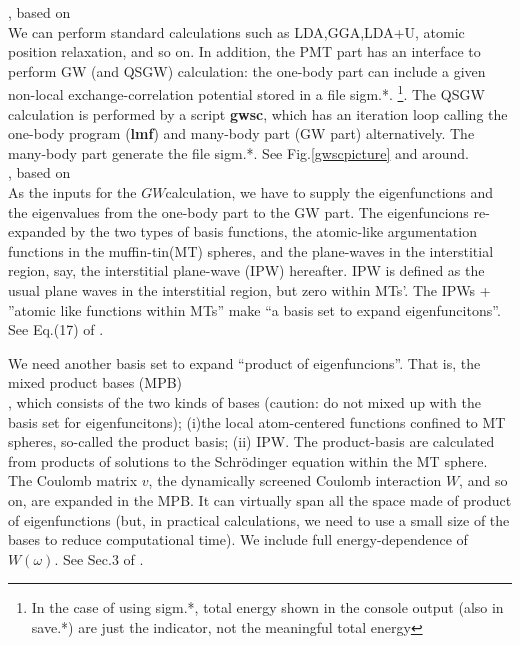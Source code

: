 \documentclass[a4paper,10pt,epsf,fleqn]{article}
\newcommand{\GW}{$GW$}
\newcommand{\exe}[1]{{\bf #1}}
\newcommand{\io}[1]{{\sf  #1}}
\begin{document}
, based on \cite{kotani2015pmt}\\
We can perform standard calculations such
as LDA,GGA,LDA+U, atomic position relaxation, and so on.
In addition, the PMT part has an interface to perform GW (and QSGW) calculation:
the one-body part can include a given non-local
exchange-correlation potential stored in a file \io{sigm.*}.
\footnote{In the case of using \io{sigm.*}, 
total energy shown in the console output 
(also in \io{save.*}) are just the indicator, not the meaningful total energy}.
The QSGW calculation is performed by a script \exe{gwsc}, which
has an iteration loop calling the one-body program (\exe{lmf}) and
many-body part (GW part) alternatively. The many-body part generate
the file \io{sigm.*}. See Fig.\ref{gwscpicture} and around.\\

, based on \cite{kotani_quasiparticle_2014}\\
As the inputs for the \GW calculation,
we have to supply the eigenfunctions and the eigenvalues
from the one-body part to the GW part. 
The eigenfuncions re-expanded by the two types of basis functions,
the atomic-like argumentation functions in the muffin-tin(MT) spheres,
and the plane-waves in the interstitial region, 
say, the interstitial plane-wave (IPW) hereafter.
IPW is defined as the usual plane waves in the interstitial region, 
but zero within MTs'. The IPWs + ''atomic like functions within MTs'' 
make ``a basis set to expand eigenfuncitons''.
See Eq.(17) of \cite{kotani_quasiparticle_2014}.

We need another basis set to expand ``product of eigenfuncions''. 
That is, the mixed product bases (MPB) \\ \cite{Kotani2002,Friedrich2012},
which consists of the two kinds of bases 
(caution: do not mixed up with the basis set for eigenfuncitons);
(i)the local atom-centered functions confined to MT spheres, so-called
the product basis; (ii) IPW. 
The product-basis are calculated from products of
solutions to the Schr\"odinger equation within the MT sphere.
The Coulomb matrix $v$, the dynamically screened 
Coulomb interaction $W$, and so on, are expanded 
in the MPB. It can virtually span all the space made of product of eigenfunctions
(but, in practical calculations, we need to use a small size of the bases
to reduce computational time).
We include full energy-dependence of $W(\omega)$.
See Sec.3 of \cite{kotani_quasiparticle_2014}.
\end{document}
